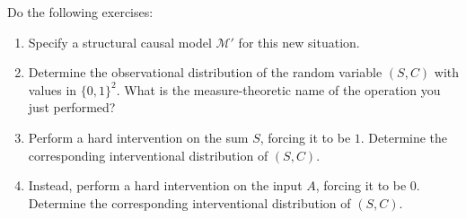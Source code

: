 \begin{enumerate}
  Do the following exercises:
  \begin{enumerate}[resume*]
    \item Specify a structural causal model $\mathcal{M}'$ for this new situation.
    \item Determine the observational distribution of the random variable $(S, C)$ with values in $\{0, 1\}^2$. What is the measure-theoretic name of the operation you just performed?
    \item Perform a hard intervention on the sum $S$, forcing it to be $1$. Determine the corresponding interventional distribution of $(S, C)$.
    \item Instead, perform a hard intervention on the input $A$, forcing it to be $0$. Determine the corresponding interventional distribution of $(S, C)$.
  \end{enumerate}


\end{enumerate}
